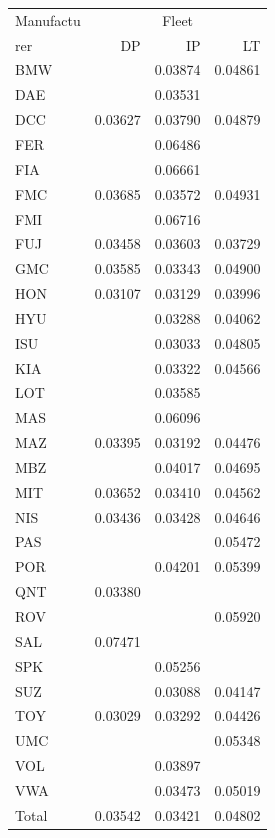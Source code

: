 \begin{tabular}{lrrr}
\toprule
Manufactu & \multicolumn{3}{c}{Fleet} \\
rer & DP & IP & LT \\
\midrule
BMW &  & 0.03874 & 0.04861 \\
DAE &  & 0.03531 &  \\
DCC & 0.03627 & 0.03790 & 0.04879 \\
FER &  & 0.06486 &  \\
FIA &  & 0.06661 &  \\
FMC & 0.03685 & 0.03572 & 0.04931 \\
FMI &  & 0.06716 &  \\
FUJ & 0.03458 & 0.03603 & 0.03729 \\
GMC & 0.03585 & 0.03343 & 0.04900 \\
HON & 0.03107 & 0.03129 & 0.03996 \\
HYU &  & 0.03288 & 0.04062 \\
ISU &  & 0.03033 & 0.04805 \\
KIA &  & 0.03322 & 0.04566 \\
LOT &  & 0.03585 &  \\
MAS &  & 0.06096 &  \\
MAZ & 0.03395 & 0.03192 & 0.04476 \\
MBZ &  & 0.04017 & 0.04695 \\
MIT & 0.03652 & 0.03410 & 0.04562 \\
NIS & 0.03436 & 0.03428 & 0.04646 \\
PAS &  &  & 0.05472 \\
POR &  & 0.04201 & 0.05399 \\
QNT & 0.03380 &  &  \\
ROV &  &  & 0.05920 \\
SAL & 0.07471 &  &  \\
SPK &  & 0.05256 &  \\
SUZ &  & 0.03088 & 0.04147 \\
TOY & 0.03029 & 0.03292 & 0.04426 \\
UMC &  &  & 0.05348 \\
VOL &  & 0.03897 &  \\
VWA &  & 0.03473 & 0.05019 \\
Total & 0.03542 & 0.03421 & 0.04802 \\
\bottomrule
\end{tabular}


